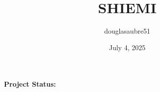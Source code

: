\documentclass[20pt,letterpaper]{article}
\title{
    SHIEMI
}
\author{
    douglasaubre51
}
\date{
    July 4, 2025 
}
\begin{document}
\maketitle

\newpage
\begin{flushleft}
    \fontsize{20pt}{22pt}\selectfont
    \textbf{
        Project Status:
    }

\end{flushleft}
\end{document}
